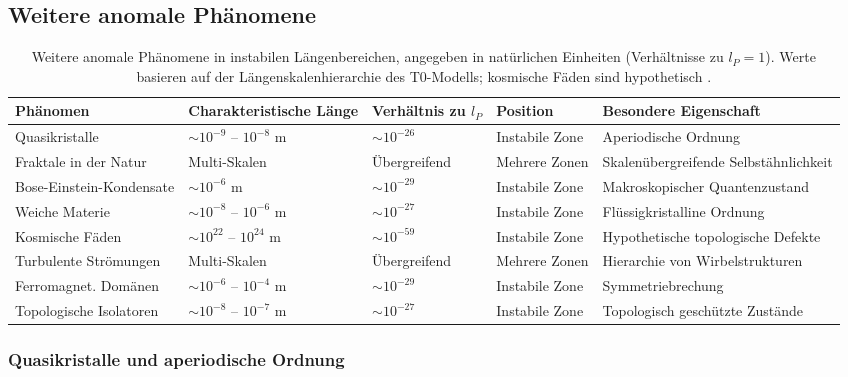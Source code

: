 \documentclass[12pt,a4paper]{article}
\begin{document}
	\subsection{Weitere anomale Phänomene}
	
	\begin{table}[h]
		\centering
		\begin{adjustbox}{scale=0.65}
			\begin{tabular}{lllll}
				\hline
				\textbf{Phänomen} & \textbf{Charakteristische Länge} & \textbf{Verhältnis zu $l_P$} & \textbf{Position} & \textbf{Besondere Eigenschaft} \\
				\hline
				Quasikristalle & $\sim 10^{-9}$ – $10^{-8}$ m & $\sim 10^{-26}$ & Instabile Zone & Aperiodische Ordnung \\
				Fraktale in der Natur & Multi-Skalen & Übergreifend & Mehrere Zonen & Skalenübergreifende Selbstähnlichkeit \\
				Bose-Einstein-Kondensate & $\sim 10^{-6}$ m & $\sim 10^{-29}$ & Instabile Zone & Makroskopischer Quantenzustand \\
				Weiche Materie & $\sim 10^{-8}$ – $10^{-6}$ m & $\sim 10^{-27}$ & Instabile Zone & Flüssigkristalline Ordnung \\
				Kosmische Fäden & $\sim 10^{22}$ – $10^{24}$ m & $\sim 10^{-59}$ & Instabile Zone & Hypothetische topologische Defekte \\
				Turbulente Strömungen & Multi-Skalen & Übergreifend & Mehrere Zonen & Hierarchie von Wirbelstrukturen \\
				Ferromagnet. Domänen & $\sim 10^{-6}$ – $10^{-4}$ m & $\sim 10^{-29}$ & Instabile Zone & Symmetriebrechung \\
				Topologische Isolatoren & $\sim 10^{-8}$ – $10^{-7}$ m & $\sim 10^{-27}$ & Instabile Zone & Topologisch geschützte Zustände \\
				\hline
			\end{tabular}
		\end{adjustbox}
		\caption{Weitere anomale Phänomene in instabilen Längenbereichen, angegeben in natürlichen Einheiten (Verhältnisse zu $l_P = 1$). Werte basieren auf der Längenskalenhierarchie des T0-Modells; kosmische Fäden sind hypothetisch \cite{pascher_nateinheiten_2025}.}
		\label{tab:more_anomalies}
	\end{table}
	
	\subsubsection{Quasikristalle und aperiodische Ordnung}
	
\end{document}
